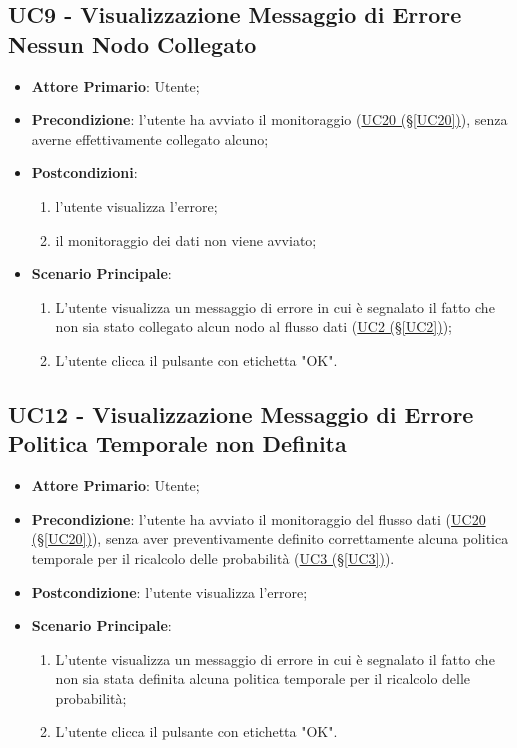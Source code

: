 \pagebreak

\subsection{UC9 - Visualizzazione Messaggio di Errore Nessun Nodo Collegato}\label{UC9}
\begin{itemize}
\item \textbf{Attore Primario}: Utente;
\item \textbf{Precondizione}: l'utente ha avviato il monitoraggio (\hyperref[UC20]{UC20 (§\ref*{UC20})}), senza averne effettivamente collegato alcuno;
\item \textbf{Postcondizioni}:
	\begin{enumerate}
	\item l'utente visualizza l'errore;
	\item il monitoraggio dei dati non viene avviato;
	\end{enumerate}
\item \textbf{Scenario Principale}:
	\begin{enumerate}
	\item L'utente visualizza un messaggio di errore in cui è segnalato il fatto che non sia stato collegato alcun 				nodo al flusso dati (\hyperref[UC2]{UC2 (§\ref*{UC2})});
	\item L'utente clicca il pulsante con etichetta "OK".
	\end{enumerate}
\end{itemize}

\pagebreak

\subsection{UC12 - Visualizzazione Messaggio di Errore Politica Temporale non Definita}\label{UC12}
\begin{itemize}
\item \textbf{Attore Primario}: Utente;
\item \textbf{Precondizione}: l'utente ha avviato il monitoraggio del flusso dati (\hyperref[UC20]{UC20 							(§\ref*{UC20})}), senza aver preventivamente definito correttamente alcuna politica temporale per il ricalcolo delle probabilità (\hyperref[UC3]{UC3 (§\ref*{UC3})}).
\item \textbf{Postcondizione}: l'utente visualizza l'errore;
\item \textbf{Scenario Principale}:
	\begin{enumerate}
	\item L'utente visualizza un messaggio di errore in cui è segnalato il fatto che non sia stata definita alcuna 				politica temporale per il ricalcolo delle probabilità;
	\item L'utente clicca il pulsante con etichetta "OK".
	\end{enumerate}
\end{itemize}

